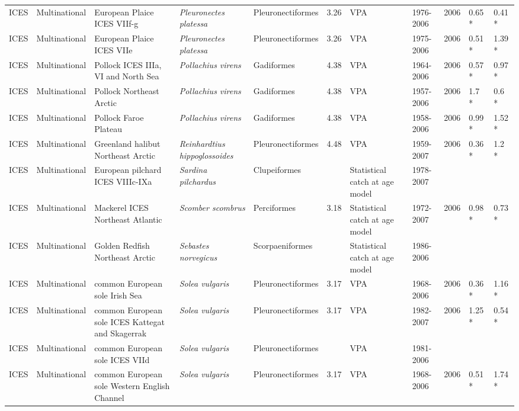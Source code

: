 \begin{longtable}{p{1.5cm}p{1.5cm}p{3cm}p{3cm}p{2.5cm}p{0.9cm}p{1.4cm}p{0.9cm}p{0.9cm}p{0.9cm}p{1cm}}
  ICES & Multinational & European Plaice ICES VIIf-g & \textit{Pleuronectes platessa} & Pleuronectiformes & 3.26 & VPA & 1976-2006 & 2006 & 0.65 * & 0.41 * \\ 
  ICES & Multinational & European Plaice ICES VIIe & \textit{Pleuronectes platessa} & Pleuronectiformes & 3.26 & VPA & 1975-2006 & 2006 & 0.51 * & 1.39 * \\ 
  ICES & Multinational & Pollock ICES IIIa, VI and North Sea & \textit{Pollachius virens} & Gadiformes & 4.38 & VPA & 1964-2006 & 2006 & 0.57 * & 0.97 * \\ 
  ICES & Multinational & Pollock Northeast Arctic & \textit{Pollachius virens} & Gadiformes & 4.38 & VPA & 1957-2006 & 2006 & 1.7 * & 0.6 * \\ 
  ICES & Multinational & Pollock Faroe Plateau & \textit{Pollachius virens} & Gadiformes & 4.38 & VPA & 1958-2006 & 2006 & 0.99 * & 1.52 * \\ 
  ICES & Multinational & Greenland halibut Northeast Arctic & \textit{Reinhardtius hippoglossoides} & Pleuronectiformes & 4.48 & VPA & 1959-2007 & 2006 & 0.36 * & 1.2 * \\ 
  ICES & Multinational & European pilchard ICES VIIIc-IXa & \textit{Sardina pilchardus} & Clupeiformes &  & Statistical catch at age model & 1978-2007 &  &  &  \\ 
  ICES & Multinational & Mackerel ICES Northeast Atlantic & \textit{Scomber scombrus} & Perciformes & 3.18 & Statistical catch at age model & 1972-2007 & 2006 & 0.98 * & 0.73 * \\ 
  ICES & Multinational & Golden Redfish Northeast Arctic & \textit{Sebastes norvegicus} & Scorpaeniformes &  & Statistical catch at age model & 1986-2006 &  &  &  \\ 
  ICES & Multinational & common European sole Irish Sea & \textit{Solea vulgaris} & Pleuronectiformes & 3.17 & VPA & 1968-2006 & 2006 & 0.36 * & 1.16 * \\ 
  ICES & Multinational & common European sole ICES Kattegat and Skagerrak & \textit{Solea vulgaris} & Pleuronectiformes & 3.17 & VPA & 1982-2007 & 2006 & 1.25 * & 0.54 * \\ 
  ICES & Multinational & common European sole ICES VIId & \textit{Solea vulgaris} & Pleuronectiformes &  & VPA & 1981-2006 &  &  &  \\ 
  ICES & Multinational & common European sole Western English Channel & \textit{Solea vulgaris} & Pleuronectiformes & 3.17 & VPA & 1968-2006 & 2006 & 0.51 * & 1.74 * \\ 

\end{longtable}
